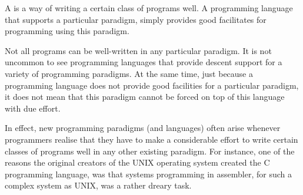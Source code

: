 A  is a way of writing a certain class of programs
well. A programming language that supports a particular paradigm, simply
provides good facilitates for programming using this paradigm.

Not all programs can be well-written in any particular paradigm. It is not
uncommon to see programming languages that provide descent support for a
variety of programming paradigms. At the same time, just because a programming
language does not provide good facilities for a particular paradigm, it does
not mean that this paradigm cannot be forced on top of this language with due
effort.

In effect, new programming paradigms (and languages) often arise whenever
programmers realise that they have to make a considerable effort to write
certain classes of programs well in any other existing paradigm.  For instance,
one of the reasons the original creators of the UNIX operating system created
the C programming language, was that systems programming in assembler, for such
a complex system as UNIX, was a rather dreary task\cite{the-development-of-c}.

